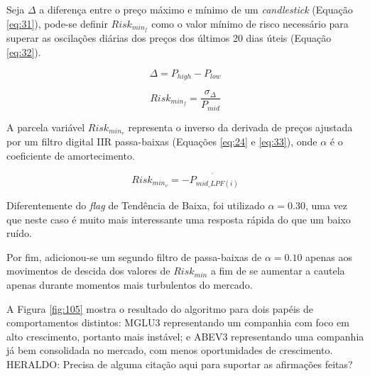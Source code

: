 \begin{itemize}
    Seja \begin{math} \Delta \end{math} a diferença entre o preço máximo e mínimo de um \textit{candlestick} (Equação \ref{eq:31}), pode-se definir \begin{math} Risk_{min_f} \end{math} como o valor mínimo de risco necessário para superar as oscilações diárias dos preços dos últimos 20 dias úteis (Equação \ref{eq:32}).

    \begin{equation} \label{eq:31}
        \Delta = P_{high} - P_{low}
    \end{equation}

    \begin{equation} \label{eq:32}
        Risk_{min_f} = \dfrac{ \sigma_{\Delta} }{ P_{mid} }
    \end{equation}

    A parcela variável \begin{math} Risk_{min_v} \end{math} representa o inverso da derivada de preços ajustada por um filtro digital IIR passa-baixas (Equações \ref{eq:24} e \ref{eq:33}), onde \begin{math} \alpha \end{math} é o coeficiente de amortecimento.

    \begin{equation} \label{eq:33}
        Risk_{min_v} = - \dot{P_{mid\_LPF(i)}}
    \end{equation}

    Diferentemente do \textit{flag} de Tendência de Baixa, foi utilizado \begin{math} \alpha = 0.30 \end{math}, uma vez que neste caso é muito mais interessante uma resposta rápida do que um baixo ruído.

    Por fim, adicionou-se um segundo filtro de passa-baixas de \begin{math} \alpha = 0.10 \end{math} apenas aos movimentos de descida dos valores de \begin{math} Risk_{min} \end{math} a fim de se aumentar a cautela apenas durante momentos mais turbulentos do mercado.

    A Figura \ref{fig:105} mostra o resultado do algoritmo para dois papéis de comportamentos distintos: MGLU3 representando um companhia com foco em alto crescimento, portanto mais instável; e ABEV3 representando uma companhia já bem consolidada no mercado, com menos oportunidades de crescimento. \color{red} HERALDO: Precisa de alguma citação aqui para suportar as afirmações feitas?  \\


\end{itemize}

